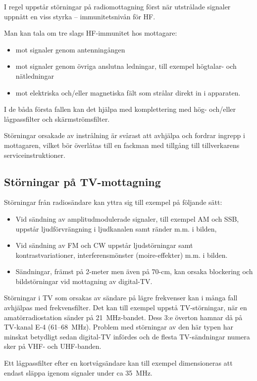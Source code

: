 I regel uppstår störningar på radiomottagning först när utstrålade signaler
uppnått en viss styrka -- immunitetsnivån för HF.

Man kan tala om tre slags HF-immunitet hos mottagare:
\begin{itemize}
\item mot signaler genom antenningången
\item mot signaler genom övriga anslutna ledningar, till exempel högtalar-
  och nätledningar
\item mot elektriska och/eller magnetiska fält som strålar direkt in i
  apparaten.
\end{itemize}

I de båda första fallen kan det hjälpa med komplettering med hög- och/eller
lågpassfilter och skärmströmsfilter.

Störningar orsakade av instrålning är svårast att avhjälpa och fordrar ingrepp i
mottagaren, vilket bör överlåtas till en fackman med tillgång till
tillverkarens serviceinstruktioner.

\subsection{Störningar på TV-mottagning}

Störningar från radiosändare kan yttra sig till exempel på följande sätt:
\begin{itemize}
\item Vid sändning av amplitudmodulerade signaler, till exempel AM och SSB,
  uppstår ljudförvrängning i ljudkanalen samt ränder m.m. i bilden,
\item Vid sändning av FM och CW uppstår ljudstörningar samt
  kontrastvariationer, interferensmönster (moire-effekter) m.m. i bilden.
\item Sändningar, främst på 2-meter men även på 70-cm, kan orsaka blockering och
  bildstörningar vid mottagning av digital-TV.
\end{itemize}

Störningar i TV som orsakas av sändare på lägre frekvenser kan i många fall
avhjälpas med frekvensfilter.
Det kan till exempel uppstå TV-störningar, när en amatörradiostation sänder på
21~MHz-bandet.
Dess 3:e överton hamnar då på TV-kanal E-4 (61--68~MHz).
Problem med störningar av den här typen har minskat betydligt sedan digital-TV
infördes och de flesta TV-sändningar numera sker på VHF- och UHF-banden.

Ett lågpassfilter efter en kortvågsändare kan till exempel dimensioneras att endast
släppa igenom signaler under ca 35~MHz.

